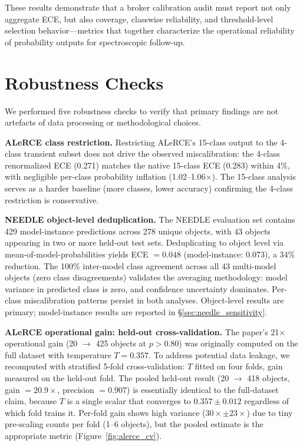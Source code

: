 \documentclass[twocolumn]{aastex631}
\begin{document}
These results demonstrate that a broker calibration audit must
report not only aggregate ECE, but also coverage, classwise
reliability, and threshold-level selection behavior---metrics
that together characterize the operational reliability of
probability outputs for spectroscopic follow-up.


\section{Robustness Checks}\label{sec:robustness}

We performed five robustness checks to verify that primary findings are not artefacts of data processing or methodological choices.

\textbf{ALeRCE class restriction.} Restricting ALeRCE's 15-class output to the 4-class transient subset does not drive the observed miscalibration: the 4-class renormalized ECE (0.271) matches the native 15-class ECE (0.283) within 4\%, with negligible per-class probability inflation (1.02--1.06$\times$). The 15-class analysis serves as a harder baseline (more classes, lower accuracy) confirming the 4-class restriction is conservative.

\textbf{NEEDLE object-level deduplication.} The NEEDLE evaluation set contains 429 model-instance predictions across 278 unique objects, with 43 objects appearing in two or more held-out test sets. Deduplicating to object level via mean-of-model-probabilities yields ECE $= 0.048$ (model-instance: 0.073), a 34\% reduction. The 100\% inter-model class agreement across all 43 multi-model objects (zero class disagreements) validates the averaging methodology: model variance in predicted class is zero, and confidence uncertainty dominates. Per-class miscalibration patterns persist in both analyses. Object-level results are primary; model-instance results are reported in \S\ref{sec:needle_sensitivity}.

\textbf{ALeRCE operational gain: held-out cross-validation.} The paper's 21$\times$ operational gain (20 $\to$ 425 objects at $p > 0.80$) was originally computed on the full dataset with temperature $T = 0.357$. To address potential data leakage, we recomputed with stratified 5-fold cross-validation: $T$ fitted on four folds, gain measured on the held-out fold. The pooled held-out result (20 $\to$ 418 objects, gain $= 20.9\times$, precision $= 0.907$) is essentially identical to the full-dataset claim, because $T$ is a single scalar that converges to $0.357 \pm 0.012$ regardless of which fold trains it. Per-fold gain shows high variance ($30\times \pm 23\times$) due to tiny pre-scaling counts per fold (1--6 objects), but the pooled estimate is the appropriate metric (Figure~\ref{fig:alerce_cv}).
\end{document}
